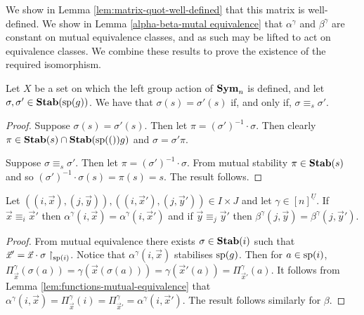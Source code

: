 \documentclass[../paper.tex]{subfiles}
\begin{document}
We show in Lemma \ref{lem:matrix-quot-well-defined} that this matrix is
well-defined. We show in Lemma \ref{alpha-beta-mutal equivalence} that
$\alpha^{\gamma}$ and $\beta^{\gamma}$ are constant on mutual equivalence
classes, and as such may be lifted to act on equivalence classes. We combine
these results to prove the existence of the required isomorphism.

\begin{lem}
  Let $X$ be a set on which the left group action of $\text{\textbf{Sym}}_n$ is defined, and
  let $\sigma, \sigma' \in \text{\textbf{Stab}}(\text{sp}(g))$. We have that $\sigma(s) = \sigma'
  (s)$ if, and only if, $\sigma \equiv_s \sigma'$.
  \label{lem:functions-mutual-equivalence}
\end{lem}
\begin{proof}
  Suppose $\sigma(s) = \sigma'(s)$. Then let $\pi = (\sigma')^{-1} \cdot
  \sigma$. Then clearly $\pi \in \text{\textbf{Stab}}(s) \cap \text{\textbf{Stab}} (\text{sp} (())g)$ and $\sigma = \sigma'
  \pi$.

  Suppose $\sigma \equiv_s \sigma'$. Then let $\pi = (\sigma')^{-1} \cdot
  \sigma$. From mutual stability $\pi \in \text{\textbf{Stab}} (s)$ and so $(\sigma')^{-1}\cdot
  \sigma (s) = \pi (s) = s$. The result follows.
\end{proof}

\begin{lem}
  Let $((i, \vec{x}), (j, \vec{y})), ((i, \vec{x}'), (j, \vec{y}')) \in I \times
  J$ and let $\gamma \in [n]^{\underline{U}}$. If $\vec{x} \equiv_i \vec{x}'$
  then $\alpha^{\gamma}(i, \vec{x}) = \alpha^{\gamma}(i, \vec{x}')$ and if
  $\vec{y} \equiv_j \vec{y}'$ then $\beta^{\gamma}(j, \vec{y}) =
  \beta^{\gamma}(j, \vec{y}')$.
  \label{lem:alpha-beta-mutal-equivalence}
\end{lem}
\begin{proof}
  From mutual equivalence there exists $\sigma \in \text{\textbf{Stab}}(i)$ such that $\vec{x}'
  = \vec{x} \cdot {\sigma}\restriction_{\text{sp}(i)}$. Notice that
  $\alpha^{\gamma}(i, \vec{x})$ stabilises $\text{sp}(g)$. Then for $a \in
  \text{sp}(i)$, $\Pi^{\gamma}_{\vec{x}} (\sigma (a)) = \gamma (\vec{x}(\sigma
  (a))) = \gamma (\vec{x}'(a)) = \Pi^{\gamma}_{\vec{x}'}(a)$. It follows from
  Lemma \ref{lem:functions-mutual-equivalence} that $\alpha^{\gamma}(i,\vec{x})
  = \Pi^{\gamma}_{\vec{x}} (i) = \Pi^{\gamma}_{\vec{x}'} = \alpha^{\gamma}(i,
  \vec{x}')$. The result follows similarly for $\beta$.
\end{proof}
\end{document}
